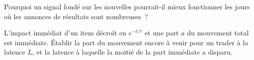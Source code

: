 \begin{interviewq}\label{iq:s1:news-and-events:5}
Pourquoi un signal fondé sur les nouvelles pourrait-il mieux fonctionner les jours où les annonces de résultats sont nombreuses~?
\end{interviewq}

\begin{interviewq}\label{iq:s1:news-and-events:6}
L'impact immédiat d'un item décroît en $e^{-t/\tau}$ et une part $a$ du mouvement total est immédiate. Établir la part du mouvement encore à venir pour un trader à la
latence $L$, et la latence à laquelle la moitié de la part immédiate a disparu.
\end{interviewq}
